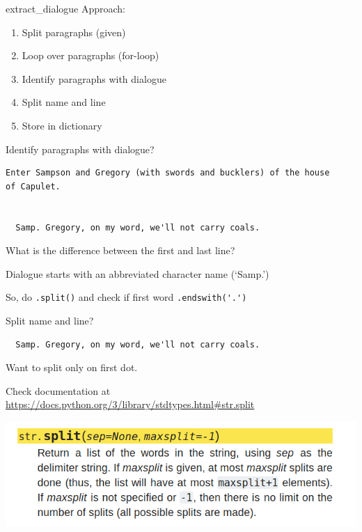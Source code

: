 \documentclass[aspectratio=169,usenames,dvipsnames]{beamer}
\begin{document}
\begin{frame}[fragile]{extract\_dialogue}
    Approach:
    \begin{enumerate}
        \item Split paragraphs (given)
        \item Loop over paragraphs (for-loop)
        \item Identify paragraphs with dialogue
        \item Split name and line
        \item Store in dictionary
    \end{enumerate}
\end{frame}

\begin{frame}[fragile]{Identify paragraphs with dialogue?}
\begin{verbatim}
Enter Sampson and Gregory (with swords and bucklers) of the house
of Capulet.


  Samp. Gregory, on my word, we'll not carry coals.
\end{verbatim}

    \vspace{1em}
    What is the difference between the first and last line?

    \pause
    Dialogue starts with an abbreviated character name (`Samp.')
    
    \vspace{1em}
    So, do \lstinline{.split()} and check if first word \lstinline{.endswith('.')}
\end{frame}

\begin{frame}[fragile]{Split name and line?}
\begin{verbatim}
  Samp. Gregory, on my word, we'll not carry coals.
\end{verbatim}

    \vspace{1em}
    Want to split only  on first dot.

    \pause\vspace{1em}
    Check documentation at \url{https://docs.python.org/3/library/stdtypes.html\#str.split}

    \vspace{1em}
    \centering
    \includegraphics[width=0.9\linewidth]{fig/splitdocs}
\end{frame}
\end{document}
